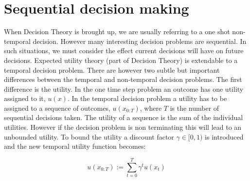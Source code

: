 \section{Sequential decision making}\label{sec:sqp}

When Decision Theory is brought up, we are usually referring to a one shot non-temporal decision. 
However many interesting decision problems are sequential. In such situations, we must consider 
the effect current decisions will have on future decisions. Expected utility theory (part of Decision Theory) is 
extendable to a temporal decision problem. There are however two subtle but important 
differences between the temporal and non-temporal decision problems. The first difference is the utility. In the one 
time step problem an outcome has one utility assigned to it, $u(x)$. In the temporal decision problem a utility has to 
be assigned to a sequence of outcomes, $u(x_{0:T})$, where $T$ is the number of sequential decisions taken. The utility 
of a sequence is the sum of the individual utilities. However if the decision problem is 
non terminating this will lead to an unbounded utility. To bound the utility a discount factor $\gamma \in [0,1)$ is 
introduced and the new temporal utility function becomes:

\begin{equation}
    u(x_{0:T}) 	   := \sum\limits_{t=0}^{T} \gamma^{t} u(x_t) \label{eq:joint_state_actions_util}
\end{equation}

